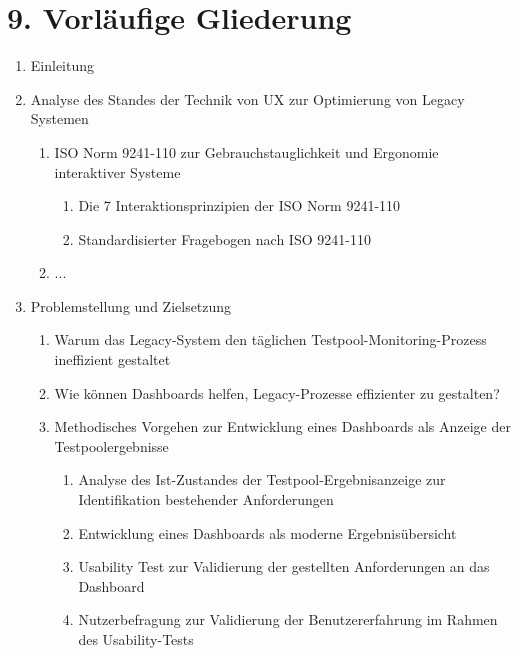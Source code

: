 \section*{9. Vorläufige Gliederung}



\begin{enumerate}
    \item Einleitung
    \item Analyse des Standes der Technik von UX zur Optimierung von Legacy Systemen
    \begin{enumerate}
        \item ISO Norm 9241-110 zur Gebrauchstauglichkeit und Ergonomie interaktiver Systeme
        \begin{enumerate}
            \item Die 7 Interaktionsprinzipien der ISO Norm 9241-110
            \item Standardisierter Fragebogen nach ISO 9241-110
        \end{enumerate}
        \item ...
    \end{enumerate}

    \item Problemstellung und Zielsetzung
    \begin{enumerate}
        \item Warum das Legacy-System den täglichen Testpool-Monitoring-Prozess ineffizient gestaltet
        \item Wie können Dashboards helfen, Legacy-Prozesse effizienter zu gestalten?
        \item Methodisches Vorgehen zur Entwicklung eines Dashboards als Anzeige der Testpoolergebnisse
        \begin{enumerate}
            \item Analyse des Ist-Zustandes der Testpool-Ergebnisanzeige zur Identifikation bestehender Anforderungen
            \item Entwicklung eines Dashboards als moderne Ergebnisübersicht
            \item Usability Test zur Validierung der gestellten Anforderungen an das Dashboard
            \item Nutzerbefragung zur Validierung der Benutzererfahrung im Rahmen des Usability-Tests
        \end{enumerate}
    \end{enumerate}


\end{enumerate}
